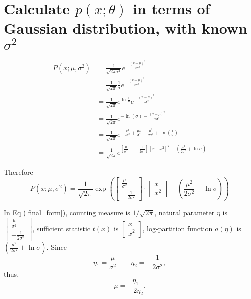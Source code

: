 \documentclass[12pt]{article}
\begin{document}
\section*{Calculate $p(x;\theta)$ in terms of Gaussian distribution, with known $\sigma^2$}
\begin{align*}
  P\left(x; \mu, \sigma^2\right) & =\frac{1}{\sqrt{2\pi\sigma^2}}e^{-\frac{\left(x-\mu\right)^2}{2\sigma^2}}                                                        \\
                                 & =\frac{1}{\sqrt{2\pi}}\frac{1}{\sigma}e^{-\frac{\left(x-\mu\right)^2}{2\sigma^2}}                                                \\
                                 & =\frac{1}{\sqrt{2\pi}}e^{\ln{\frac{1}{\sigma}}}e^{-\frac{\left(x-\mu\right)^2}{2\sigma^2}}                                       \\
                                 & =\frac{1}{\sqrt{2\pi}}e^{-\ln\left(\sigma\right)-\frac{\left(x-\mu\right)^2}{2\sigma^2}}                                         \\
                                 & =\frac{1}{\sqrt{2\pi}}e^{-\frac{x^2}{2\sigma^2}+\frac{\mu x}{\sigma^2}-\frac{\mu^2}{2\sigma^2}+\ln\left(\frac{1}{\sigma}\right)} \\
                                 & =\frac{1}{\sqrt{2\pi}}e^{\left[
    \frac{\mu}{\sigma^2}\quad-\frac{1}{2\sigma^2}\right]
  \left[x\quad x^2\right]^T-\left(\frac{\mu^2}{2\sigma^2}+\ln\sigma\right)}
\end{align*}

Therefore
\begin{equation}
  P\left(x; \mu, \sigma^2\right)= \frac{1}{\sqrt{2\pi}}\exp\left( {\begin{bmatrix}
      \frac{\mu}{\sigma^2} \\-\frac{1}{2\sigma^2}
    \end{bmatrix}\cdot\begin{bmatrix}
      x \\x^2
    \end{bmatrix}
    -\left(\frac{\mu^2}{2\sigma^2}+\ln\sigma\right)} \right)
  \label{final_form}
\end{equation}

In Eq (\ref{final_form}), counting measure is $1/\sqrt{2\pi}$, natural parameter $\eta$ is $\begin{bmatrix}
    \frac{\mu}{\sigma^2} \\-\frac{1}{2\sigma^2}
  \end{bmatrix}$, sufficient statistic $t(x)$ is $\begin{bmatrix}
    x \\x^2
  \end{bmatrix}$, log-partition function $a(\eta)$ is $\left(\frac{\mu^2}{2\sigma^2}+\ln\sigma\right)$. Since \[\eta_1 =\frac{\mu}{\sigma^2}\qquad \eta_2 =-\frac{1}{2\sigma^2},\] thus,
$$
  \mu=\frac{\eta_1}{-2\eta_2}.
$$
\end{document}
